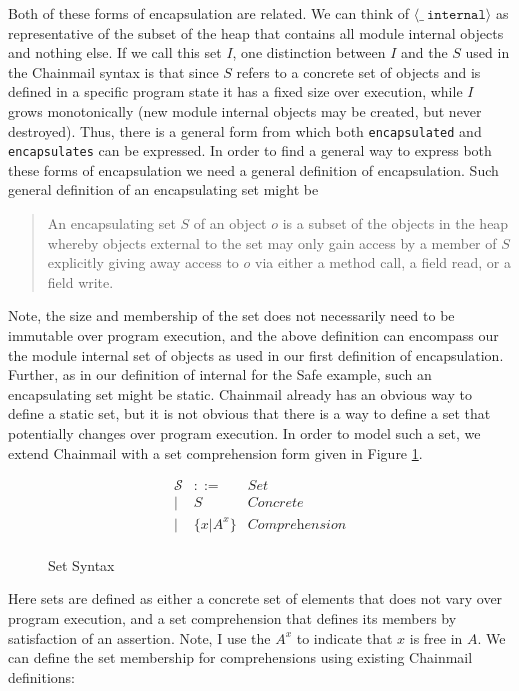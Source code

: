\documentclass[12pt]{article}
\newcommand\internal[1]{\langle #1\ \texttt{internal}\rangle}
\newcommand\comprehension[2]{\{#1 | #2\}}
\numberwithin{case}{lemma}
\numberwithin{case}{theorem}
\numberwithin{subcase}{case}
\begin{document}
Both of these forms of encapsulation are related. We can think of $\internal {\_}$ as representative of the 
subset of the heap that contains all module internal objects and nothing else. If we call this set $I$, one distinction between 
$I$ and the $S$ used in the Chainmail syntax is that since $S$ refers to a concrete set of objects and is defined in a specific program state it has a fixed size over execution,
while $I$ grows monotonically (new module internal objects may be created, but never destroyed). Thus, there is a general 
form from which both \texttt{encapsulated} and \texttt{encapsulates} can be
expressed. In order to find a general way to express both these forms of encapsulation
we need a general definition of encapsulation.
Such general definition of an encapsulating set might be
\begin{quote}
An encapsulating set $S$ of an object $o$ is a subset of the objects in the heap
whereby objects external to the set may only gain access by a member of $S$ explicitly 
giving away access to $o$ via either a method call, a field read, or a field write.
\end{quote}
Note, the size and membership of the set does not necessarily need to be immutable over program execution, 
and the above definition can encompass our the module internal set of objects as used
in our first definition of encapsulation. Further, as in our 
definition of internal for the Safe example, such an encapsulating set might be static. 
Chainmail already has an obvious way to define a static set, but it is not obvious
that there is a way to define a set that potentially changes over program execution.
In order to model such a set, we extend Chainmail with a set comprehension form given 
in Figure \ref{f:sets}.
\begin{figure}[h]
	\[
	\begin{array}{llr}
	\mathcal{S} & ::= & \textit{Set}\\
	| & S & \textit{Concrete}\\
	| & \comprehension{x}{A^x} & \textit{Comprehension}\\
	\end{array}
	\]
	\caption{Set Syntax}
	\label{f:sets}
\end{figure}
Here sets are defined as either a concrete set of elements that does not vary over 
program execution, and a set comprehension that defines its members by satisfaction of 
an assertion. Note, I use the $A^x$ to indicate that $x$ is free in $A$. We can define 
the set membership for comprehensions using existing Chainmail definitions:
\end{document}
